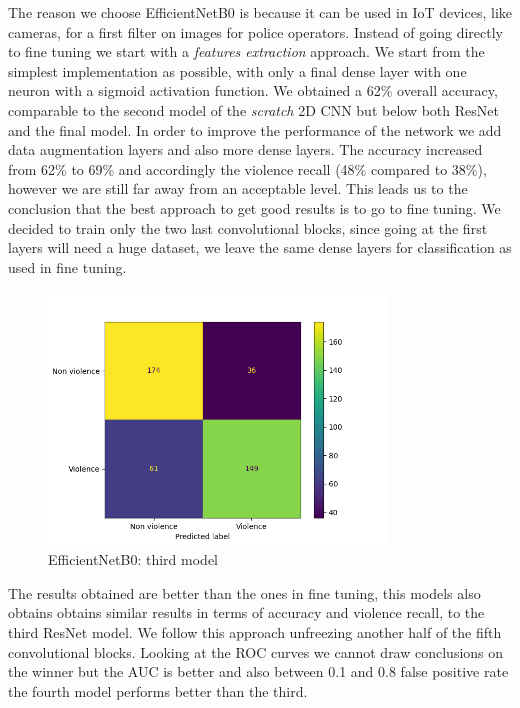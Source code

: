 The reason we choose EfficientNetB0 is because it can be used in IoT devices, like cameras, for a first filter on images for police operators.
Instead of going directly to fine tuning we start with a \textit{features extraction} approach.
We start from the simplest implementation as possible, with only a final dense layer with one neuron with a sigmoid activation function.
We obtained a 62\% overall accuracy, comparable to the second model of the \emph{scratch} 2D CNN but below both ResNet and the final model. In order to improve the performance of the network we add data augmentation layers and also more dense layers.
The accuracy increased from 62\% to 69\% and accordingly the violence recall (48\% compared to 38\%), however we are still far away from an acceptable level. This leads us to the conclusion that the best approach to get good results is to go to fine tuning. 
We decided to train only the two last convolutional blocks, since going at the first layers will need a huge dataset, we leave the same dense layers for classification as used in fine tuning. 
\begin{figure}[h!]
    \centering
    \includegraphics[width=0.8\textwidth]{images/731a-EfficientNetB0_15-5a4e-conf_matrix.png}
    \caption{EfficientNetB0: third model}
    \label{fig:EfficientNetB0_15}
\end{figure}
The results obtained are better than the ones in fine tuning, this models also obtains obtains similar results in terms of accuracy and violence recall, to the third ResNet model. 
We follow this approach unfreezing another half of the fifth convolutional blocks.
Looking at the ROC curves we cannot draw conclusions on the winner but the AUC is better and also between 0.1 and 0.8 false positive rate the fourth model performs better than the third. 

